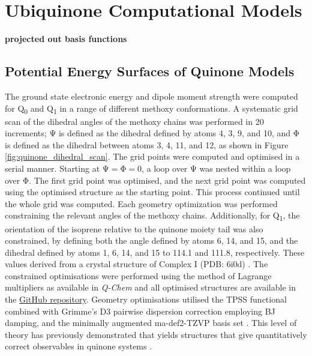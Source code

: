 \section{Ubiquinone Computational Models}
\textbf{projected out basis functions}

\subsection{Potential Energy Surfaces of Quinone Models}

The ground state electronic energy and dipole moment strength were computed for Q\textsubscript{0} and Q\textsubscript{1} in a range of different methoxy conformations. A systematic grid scan of the dihedral angles of the methoxy chains was performed in 20\degree{} increments; $\mathrm{\Psi}$ is defined as the dihedral defined by atoms 4, 3, 9, and 10, and $\mathrm{\Phi}$ is defined as the dihedral between atoms 3, 4, 11, and 12, as shown in Figure \ref{fig:quinone_dihedral_scan}. 
The grid points were computed and optimised in a serial manner. Starting at $\mathrm{\Psi=\Phi=}$0\degree, a loop over $\mathrm{\Psi}$ was nested within a loop over $\mathrm{\Phi}$. The first grid point was optimised, and the next grid point was computed using the optimised structure as the starting point. This process continued until the whole grid was computed. Each geometry optimization was performed constraining the relevant angles of the methoxy chains. Additionally, for Q\textsubscript{1}, the orientation of the isoprene relative to the quinone moiety tail was also constrained, by defining both the angle defined by atoms 6, 14, and 15, and the dihedral defined by atoms 1, 6, 14, and 15 to 114.1\degree{} and 111.8\degree{}, respectively. These values derived from a crystal structure of Complex I (PDB: 6i0d) \cite{gutierrez2020key}. The constrained optimisations were performed using the method of Lagrange multipliers as available in \textit{Q-Chem} and all optimised structures are available in the \href{https://github.com/EliteSushi/TCCM_Thesis}{GitHub repository}. Geometry optimisations utilised the TPSS functional \cite{tao2003climbing} combined with Grimme's D3 pairwise dispersion correction \cite{grimme2011effect} employing BJ damping\cite{becke2005density}, and the minimally augmented ma-def2-TZVP basis set \cite{zheng2011minimally,weigend2005balanced}. This level of theory has previously demonstrated that yields structures that give quantitatively correct observables in quinone systems \cite{schulz2018systematic}.\\

